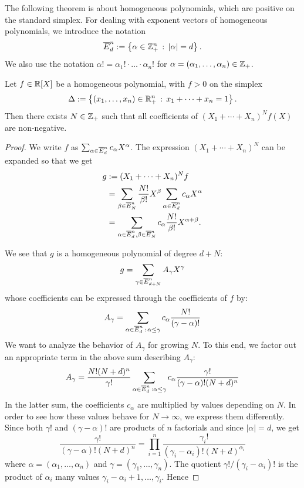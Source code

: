 The following theorem is about homogeneous polynomials, which are positive on the standard simplex.
For dealing with exponent vectors of homogeneous polynomials, we introduce the notation 
\[
	\overline{E}^n_d := \left\{ \alpha \in \mathbb{Z}_+^n \,:\, |\alpha | =d \right\}.
\]
We also use the notation $\alpha ! = \alpha_1 ! \cdot \ldots \cdot \alpha_n !$ for $\alpha = (\alpha_1,\ldots,\alpha_n) \in \mathbb{Z}_+$.


\begin{theorem}[P\'olya 1928] 
	Let $f \in \mathbb{R}[X]$ be a homogeneous polynomial, with $f> 0$ on the simplex 
	\[
		\Delta := \left\{ (x_1,\ldots,x_n) \in \mathbb{R}_+^n \,:\, x_1 + \cdots + x_n =1 \right\}.
	\]
	Then there exists $N \in \mathbb{Z}_+$ such that all coefficients of $(X_1 + \cdots + X_n)^N f(X)$ are non-negative. 
\end{theorem}
\begin{proof}

	We write $f$ as $\sum_{\alpha \in \overline{E}^n_d} c_\alpha X^\alpha$. The expression $(X_1 + \cdots + X_n)^N$ can be expanded so that we get
	\begin{align*}
		 g & := (X_1+ \cdots + X_n)^N f 
		 \\ & = \sum_{\beta \in \overline{E}^n_N} \frac{N!}{\beta !} X^\beta \sum_{\alpha \in \overline{E}^n_d} c_\alpha X^\alpha 
		 \\ & = \sum_{\alpha \in \overline{E}^n_d, \beta \in \overline{E}^n_N} c_\alpha \frac{N!}{\beta!} X^{\alpha+\beta}.
	\end{align*}
	
	We see that $g$ is a homogeneous polynomial of degree $d+N$:
	\[
		g = \sum_{\gamma \in \overline{E}^n_{d+N}} A_\gamma X^\gamma
	\]
	whose coefficients can be expressed through the coefficients of $f$ by:
	\begin{equation}
		\label{A:gamma:first:eq}
		A_\gamma = \sum_{\alpha \in \overline{E}^n_d \,:\, \alpha \le \gamma} c_\alpha \frac{N!}{(\gamma-\alpha)!} 
	\end{equation}
	We want to analyze the behavior of $A_\gamma$ for growing $N$. To this end, we factor out an appropriate term in the above sum describing $A_\gamma$:
	\[
		A_\gamma = \frac{N!(N+d)^n}{\gamma!} \sum_{\alpha \in \overline{E}^n_d \, : \alpha \le \gamma} c_\alpha \frac{\gamma !}{(\gamma-\alpha)! (N+d)^n}
	\]
	In the latter sum, the coefficients $c_\alpha$ are multiplied by values depending on $N$. In order to see how these values behave for $N \to \infty$, we express them differently. Since both $\gamma!$ and $(\gamma-\alpha)!$ are products of $n$ factorials and since $|\alpha|=d$, we get
	\[
		\frac{\gamma!}{(\gamma-\alpha)! (N+d)^n} = \prod_{i=1}^n \frac{\gamma_i !}{(\gamma_i-\alpha_i)! (N+d)^{\alpha_i}} 
	\]
	where $\alpha = (\alpha_1,\ldots,\alpha_n)$ and $\gamma=(\gamma_1,\ldots,\gamma_n)$. The quotient $\gamma! / (\gamma_i-\alpha_i)!$ is the product of $\alpha_i$ many values $\gamma_i-\alpha_i+1,\ldots,\gamma_i$. Hence 
	

\end{proof}
